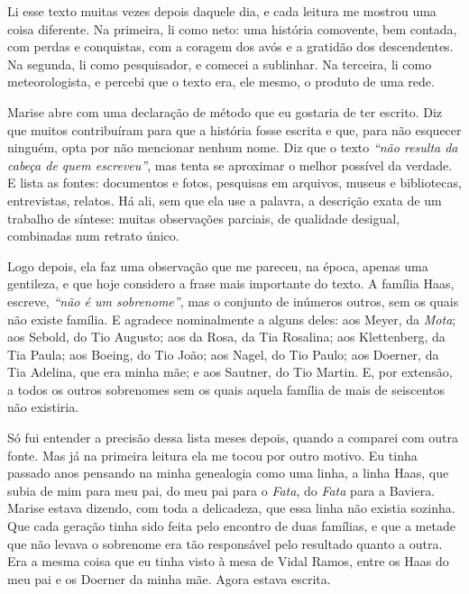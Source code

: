 \documentclass[
  brazilian,
  11pt,
  openany]{book}
\begin{document}
Li esse texto muitas vezes depois daquele dia, e cada leitura me mostrou
uma coisa diferente. Na primeira, li como neto: uma história comovente,
bem contada, com perdas e conquistas, com a coragem dos avós e a
gratidão dos descendentes. Na segunda, li como pesquisador, e comecei a
sublinhar. Na terceira, li como meteorologista, e percebi que o texto
era, ele mesmo, o produto de uma rede.

Marise abre com uma declaração de método que eu gostaria de ter escrito.
Diz que muitos contribuíram para que a história fosse escrita e que,
para não esquecer ninguém, opta por não mencionar nenhum nome. Diz que o
texto \emph{``não resulta da cabeça de quem escreveu''}, mas tenta se
aproximar o melhor possível da verdade. E lista as fontes: documentos e
fotos, pesquisas em arquivos, museus e bibliotecas, entrevistas,
relatos. Há ali, sem que ela use a palavra, a descrição exata de um
trabalho de síntese: muitas observações parciais, de qualidade desigual,
combinadas num retrato único.

Logo depois, ela faz uma observação que me pareceu, na época, apenas uma
gentileza, e que hoje considero a frase mais importante do texto. A
família Haas, escreve, \emph{``não é um sobrenome''}, mas o conjunto de
inúmeros outros, sem os quais não existe família. E agradece
nominalmente a alguns deles: aos Meyer, da \emph{Mota}; aos Sebold, do
Tio Augusto; aos da Rosa, da Tia Rosalina; aos Klettenberg, da Tia
Paula; aos Boeing, do Tio João; aos Nagel, do Tio Paulo; aos Doerner, da
Tia Adelina, que era minha mãe; e aos Sautner, do Tio Martin. E, por
extensão, a todos os outros sobrenomes sem os quais aquela família de
mais de seiscentos não existiria.

Só fui entender a precisão dessa lista meses depois, quando a comparei
com outra fonte. Mas já na primeira leitura ela me tocou por outro
motivo. Eu tinha passado anos pensando na minha genealogia como uma
linha, a linha Haas, que subia de mim para meu pai, do meu pai para o
\emph{Fata}, do \emph{Fata} para a Baviera. Marise estava dizendo, com
toda a delicadeza, que essa linha não existia sozinha. Que cada geração
tinha sido feita pelo encontro de duas famílias, e que a metade que não
levava o sobrenome era tão responsável pelo resultado quanto a outra.
Era a mesma coisa que eu tinha visto à mesa de Vidal Ramos, entre os
Haas do meu pai e os Doerner da minha mãe. Agora estava escrita.
\end{document}
